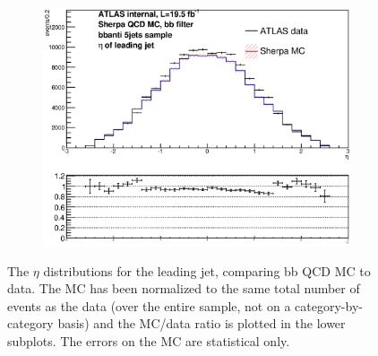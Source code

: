 \begin{figure}[phtb!]
\begin{center}
  \begin{subfigure}[$bbanti$ 5+ jet category]{0.3\textwidth}\includegraphics[width=\textwidth]{MonteCarlo/figures/eta0_bbanti_5jets.eps}\end{subfigure}
  \caption{The $\eta$ distributions for the leading jet, comparing bb QCD MC to data.  The MC has been normalized
  to the same total number of events as the data (over the entire sample, not on a category-by-category basis)
  and the MC/data ratio is plotted in the lower subplots.  The errors on the MC are statistical only.
  \label{fig:bb_qcd_mc_eta0}}
    \end{center}
\end{figure}



